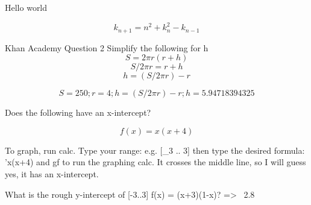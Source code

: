 \documentclass{article}
\begin{document}
Hello world

\begin{equation}
k_{n+1} = n^2 + k_n^2 - k_{n-1}
\end{equation}

Khan Academy Question 2
Simplify the following for h
\begin{equation}
S=2\pi r(r+h)
\end{equation}
\begin{equation}
S/2\pi r=r+h
\end{equation}
\begin{equation}
h=(S/2\pi r)-r
\end{equation}

\begin{equation}
  S=250;
  r=4;
  h=(S/2\pi r)-r;
  h= 5.94718394325
\end{equation}


Does the following have an x-intercept?

\begin{equation}
  f(x) = x(x+4)
\end{equation}

To graph, run calc. Type your range: e.g. [_3 .. 3] then type the desired
formula: 'x(x+4) and gf to run the graphing calc. It crosses the middle line, so
I will guess yes, it has an x-intercept.

What is the rough y-intercept of [-3..3] f(x) = (x+3)(1-x)? => ~2.8
\end{document}
